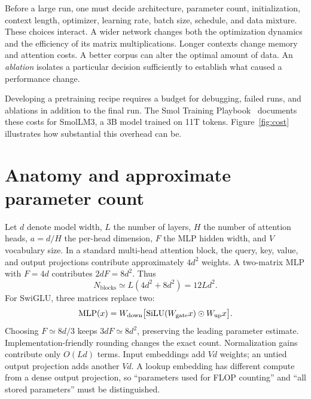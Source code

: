 Before a large run, one must decide architecture, parameter count, initialization, context length, optimizer, learning rate, batch size, schedule, and data mixture. These choices interact. A wider network changes both the optimization dynamics and the efficiency of its matrix multiplications. Longer contexts change memory and attention costs. A better corpus can alter the optimal amount of data. An \emph{ablation} isolates a particular decision sufficiently to establish what caused a performance change.

Developing a pretraining recipe requires a budget for debugging, failed runs, and ablations in addition to the final run. The Smol Training Playbook~\cite{smol} documents these costs for SmolLM3, a 3B model trained on 11T tokens. Figure~\ref{fig:cost} illustrates how substantial this overhead can be.

\section{Anatomy and approximate parameter count}
Let $d$ denote model width, $L$ the number of layers, $H$ the number of attention heads, $a=d/H$ the per-head dimension, $F$ the MLP hidden width, and $V$ vocabulary size. In a standard multi-head attention block, the query, key, value, and output projections contribute approximately $4d^2$ weights. A two-matrix MLP with $F=4d$ contributes $2dF=8d^2$. Thus
\begin{equation}\label{eq:parameters}
 N_{\mathrm{blocks}}\simeq L(4d^2+8d^2)=12Ld^2.
\end{equation}
For SwiGLU, three matrices replace two:
\begin{equation}
 \operatorname{MLP}(x)=W_{\rm down}\bigl[\operatorname{SiLU}(W_{\rm gate}x)\odot W_{\rm up}x\bigr].
\end{equation}
Choosing $F\simeq 8d/3$ keeps $3dF\simeq8d^2$, preserving the leading parameter estimate. Implementation-friendly rounding changes the exact count. Normalization gains contribute only $O(Ld)$ terms. Input embeddings add $Vd$ weights; an untied output projection adds another $Vd$. A lookup embedding has different compute from a dense output projection, so ``parameters used for FLOP counting'' and ``all stored parameters'' must be distinguished.


